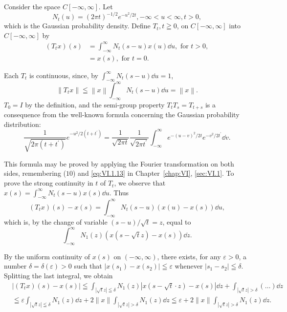 \begin{example}\label{ex:IX.2.Example.2} Consider the space $C[-\infty, \infty]$. Let 
\[
N _{t} (u) = (2 \pi t) ^{-1/2} e ^ {- u ^{2} / 2 t}, - \infty < u < \infty , t > 0,
\]
which is the Gaussian probability density. Define $T_{t}, t \geqq 0$, on $C[-\infty, \infty]$ into $C[-\infty, \infty]$ by 
\[
\begin{aligned} (T _{t} x) (s) & = \int_{- \infty} ^{\infty} N _{t} (s - u) x (u) \dd u, \text{ for } t > 0, \\ & = x (s), \text{ for } t = 0. \end{aligned}
\]
\end{example}

Each $T_{t}$ is continuous, since, by $\int_{-\infty}^{\infty} N_{t}(s - u) \dd u = 1$, 
\[
\left\| T _{t} x \right\| \leqq \left\| x \right\| \int_{- \infty} ^{\infty} N _{t} (s - u) \dd u = \left\| x \right\|.
\]
$T_{0}=I$ by the definition, and the semi-group property $T_{t}T_{s}=T_{t+s}$ is a consequence from the well-known formula concerning the Gaussian probability distribution: 
\[
\frac {1}{\sqrt {2 \pi (t + t ^{\prime})}} e ^ {- u ^{2} / 2 (t + t ^{\prime})} = \frac {1}{\sqrt {2 \pi t}} \frac {1}{\sqrt {2 \pi t ^{\prime}}} \int_{- \infty} ^{\infty} e ^ {- (u - v) ^{2} / 2 t} e ^ {- v ^{2} / 2 t ^{\prime}} \dd v.
\]

This formula may be proved by applying the Fourier transformation on both sides, remembering ($10$) and \eqref{eq:VI.1.13} in Chapter~\ref{chap:VI}, \ref{sec:VI.1}. To prove the strong continuity in $t$ of $T_{t}$, we observe that $x(s) = \int_{-\infty}^{\infty} N_{t}(s - u) x(s) \dd u$. Thus 
\[
(T _{t} x) (s) - x (s) = \int_{- \infty} ^{\infty} N _{t} (s - u) (x (u) - x (s)) \dd u,
\]
which is, by the change of variable $(s - u) / \sqrt{t} = z$, equal to 
\[
\int_{- \infty} ^{\infty} N _{1} (z) \left(x (s - \sqrt {t} z) - x (s)\right) \dd z.
\]

By the uniform continuity of $x(s)$ on $(-\infty, \infty)$, there exists, for any $\varepsilon > 0$, a number $\delta = \delta(\varepsilon) > 0$ such that $|x(s_1) - x(s_2)| \leqq \varepsilon$ whenever $|s_1 - s_2| \leqq \delta$. Splitting the last integral, we obtain 
\[
\begin{aligned}
&\left| (T _{t} x) (s) - x (s) \right| \leqq \int_ {| \sqrt {t} z | \leqq \delta} N _{1} (z) \left| x (s - \sqrt {t} \cdot z) - x (s) \right| \dd z + \int_ {| \sqrt {t} z | > \delta} (\dots) \dd z
\\
&\leqq \varepsilon \int_ {| \sqrt {t} z | \leqq \delta} N _{1} (z) \dd z + 2 \| x \| \int_ {| \sqrt {t} z | > \delta} N _{1} (z) \dd z \leqq \varepsilon + 2 \| x \| \int_ {| \sqrt {t} z | > \delta} N _{1} (z) \dd z.
\end{aligned}
\]

